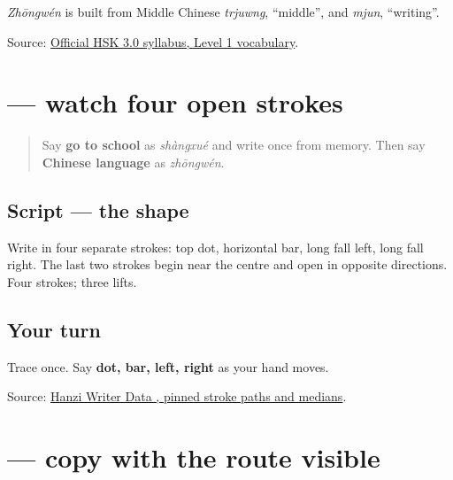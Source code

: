 \emph{Zhōngwén} is built from Middle Chinese \emph{trjuwng}, \textquotedblleft{}middle\textquotedblright{}, and \emph{mjun}, \textquotedblleft{}writing\textquotedblright{}.

\begin{tcolorbox}[breakable,colback=teal!4,colframe=teal!35!black,title={Before you move on}]
Source: \href{https://hsk.cn-bj.ufileos.com/3.0/\%E6\%96\%B0\%E7\%89\%88HSK\%E8\%80\%83\%E8\%AF\%95\%E5\%A4\%A7\%E7\%BA\%B21219.pdf}{Official HSK 3.0 syllabus, Level 1 vocabulary}.
\end{tcolorbox}
\section[\texorpdfstring{\zh{文} (wén)}{文 (wén)}]{ — watch four open strokes}

\label{lesson:ZH-W17-wen-observe}



\begin{quote}
Say \textbf{go to school} as \emph{shàngxué} and write  once from memory. Then say \textbf{Chinese language} as \emph{zhōngwén}.
\end{quote}

\subsection*{Script — the shape}

Write \textbf{} in four separate strokes: top dot, horizontal bar, long fall left, long fall right. The last two strokes begin near the centre and open in opposite directions. Four strokes; three lifts.

\subsection*{Your turn}
Trace \textbf{} once. Say \textbf{dot, bar, left, right} as your hand moves.

\begin{tcolorbox}[breakable,colback=teal!4,colframe=teal!35!black,title={Before you move on}]
Source: \href{https://raw.githubusercontent.com/chanind/hanzi-writer-data/68d10a4b21150cae5e1ebbd223eed289cf32d90c/data/\%E6\%96\%87.json}{Hanzi Writer Data , pinned stroke paths and medians}.
\end{tcolorbox}
\section[\texorpdfstring{\zh{文} (wén)}{文 (wén)}]{ — copy with the route visible}

